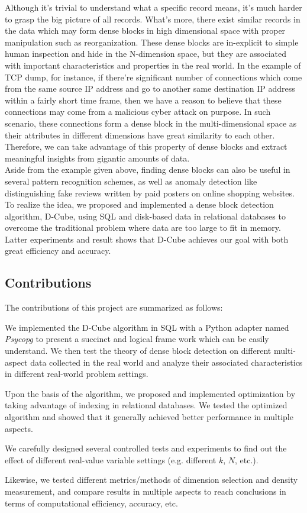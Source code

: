 Although it's trivial to understand what a specific record means, it's much harder to grasp the big picture of all records. What's more, there exist similar records in the data which may form dense blocks in high dimensional space with proper manipulation such as reorganization. These dense blocks are in-explicit to simple human inspection and hide in the N-dimension space, but they are associated with important characteristics and properties in the real world. In the example of TCP dump, for instance, if there're significant number of connections which come from the same source IP address and go to another same destination IP address within a fairly short time frame, then we have a reason to believe that these connections may come from a malicious cyber attack on purpose. In such scenario, these connections form a dense block in the multi-dimensional space as their attributes in different dimensions have great similarity to each other. Therefore, we can take advantage of this property of dense blocks and extract meaningful insights from gigantic amounts of data. \\ 

Aside from the example given above, finding dense blocks can also be useful in several pattern recognition schemes, as well as anomaly detection like distinguishing fake reviews written by paid posters on online shopping websites. To realize the idea, we proposed and implemented a dense block detection algorithm, D-Cube\cite{shin2017d}, using SQL and disk-based data in relational databases to overcome the traditional problem where data are too large to fit in memory. Latter experiments and result shows that D-Cube achieves our goal with both great efficiency and accuracy. 

\subsection{Contributions}

The contributions of this project are summarized as follows:
\bit
\setlength\itemsep{1em}
\item We implemented the D-Cube algorithm in SQL with a Python adapter named \textit{Psycopg} to present a succinct and logical frame work which can be easily understand. We then test the theory of dense block detection on different multi-aspect data collected in the real world and analyze their associated characteristics in different real-world problem settings.
\item Upon the basis of the algorithm, we proposed and implemented optimization by taking advantage of indexing in relational databases. We tested the optimized algorithm and showed that it generally achieved better performance in multiple aspects.    
\item We carefully designed several controlled tests and experiments to find out the effect of different real-value variable settings (e.g. different $k$, $N$, etc.).  
\item Likewise, we tested different metrics/methods of dimension selection and density measurement, and compare results in multiple aspects to reach conclusions in terms of computational efficiency, accuracy, etc.\\

